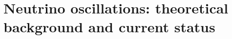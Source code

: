 \chapter{Neutrino oscillations: theoretical background and current status}
\label{chap:theory}

\begin{comment}
Welcome to neutrino physics, it all began at the beggining of the century with Wolfgang puali etc
etc... Lots of postulating from various people and some really cool experiments with lots of
exciting details later, it was found that there was a neutrino corresponding to each of the
leptons, electon, muon and tau. In the original standard model these are expected to be massless,
charge-0, spin 1/2 particles that are very very waekly interacting with tiny cross sections,
making them an increadibly difficult challenge for experimentalists in the years to come.

It was then noticed by a succesion of different experiments that a few different things did not
add up, the number of neutrinos seen with the expected flavour was wrong. Lots of people then
invested loads of time into tyring to figure this out and it was finally found by SNO which used
channels sensative to the three flavours in different ways, that some neutrinos had turned into
other neutrino flavours, shock horror.

This is explained by supposing that the neutrino flavour states (the ones that interact with the
weak force) are infact a superposition of neutrino mass states. The mixing between these two basis
is described by the PMNS matrix, which contains 3 mixing angles and a phase. An additional two
phases are included if the particles are majorana. What this means is that as the energy states
porpogate through matter differently, he superposition of them leads to neutrino oscillations as
the probability of detecting a certain flavour state changes as the neutrino travels.

The actual oscillation probability derivation is quite complex, and is affected by the matter
through which it travels due to matter having lots of electrons in it. But it generally leads to
sinosoidal probabilities with a phase dependent on the neutrino mass splitting and L/E and an
amplitude dependent on the mixing angles. The single phase, also governs if this oscillation
probability is different between neutrinos and anti-neutrinos and it hence known as the CP
violating phase.


\end{comment}
